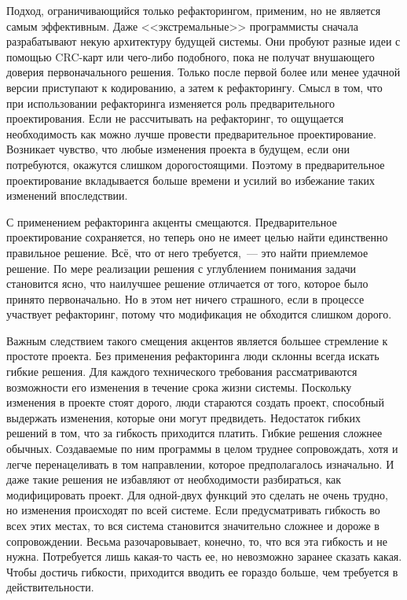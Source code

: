 \documentclass{../../text-style}
\begin{document}
Подход, ограничивающийся только рефакторингом, применим, но не является самым эффективным. Даже <<экстремальные>> программисты сначала разрабатывают некую архитектуру будущей системы. Они пробуют разные идеи с помощью CRC-карт или чего-либо подобного, пока не получат внушающего доверия первоначального решения. Только после первой более или менее удачной версии приступают к кодированию, а затем к рефакторингу. Смысл в том, что при использовании рефакторинга изменяется роль предварительного проектирования. Если не рассчитывать на рефакторинг, то ощущается необходимость как можно лучше провести предварительное проектирование. Возникает чувство, что любые изменения проекта в будущем, если они потребуются, окажутся слишком дорогостоящими. Поэтому в предварительное проектирование вкладывается больше времени и усилий во избежание таких изменений впоследствии.

С применением рефакторинга акценты смещаются. Предварительное проектирование сохраняется, но теперь оно не имеет целью найти единственно правильное решение. Всё, что от него требуется,~--- это найти приемлемое решение. По мере реализации решения с углублением понимания задачи становится ясно, что наилучшее решение отличается от того, которое было принято первоначально. Но в этом нет ничего страшного, если в процессе участвует рефакторинг, потому что модификация не обходится слишком дорого.

Важным следствием такого смещения акцентов является большее стремление к простоте проекта. Без применения рефакторинга люди склонны всегда искать гибкие решения. Для каждого технического требования рассматриваются возможности его изменения в течение срока жизни системы. Поскольку изменения в проекте стоят дорого, люди стараются создать проект, способный выдержать изменения, которые они могут предвидеть. Недостаток гибких решений в том, что за гибкость приходится платить. Гибкие решения сложнее обычных. Создаваемые по ним программы в целом труднее сопровождать, хотя и легче перенацеливать в том направлении, которое предполагалось изначально. И даже такие решения не избавляют от необходимости разбираться, как модифицировать проект. Для одной-двух функций это сделать не очень трудно, но изменения происходят по всей системе. Если предусматривать гибкость во всех этих местах, то вся система становится значительно сложнее и дороже в сопровождении. Весьма разочаровывает, конечно, то, что вся эта гибкость и не нужна. Потребуется лишь какая-то часть ее, но невозможно заранее сказать какая. Чтобы достичь гибкости, приходится вводить ее гораздо больше, чем требуется в действительности.
\end{document}
